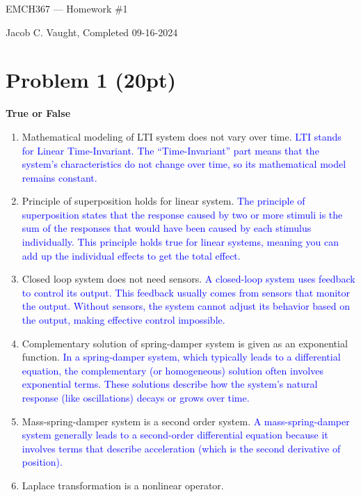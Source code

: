 \documentclass{article}
\begin{document}
\begin{center}
	{\Huge EMCH367 --- Homework \#1}
\end{center}
Jacob C. Vaught, Completed 09-16-2024

\section*{Problem 1 (20pt)}
\textbf{True or False}
\begin{enumerate}
	\item Mathematical modeling of LTI system does not vary over time.\newline
	      \textcolor{blue}{LTI stands for Linear Time-Invariant. The ``Time-Invariant'' part means that the system's characteristics do not change over time, so its mathematical model remains constant.}
	\item Principle of superposition holds for linear system.\newline
	      \textcolor{blue}{The principle of superposition states that the response caused by two or more stimuli is the sum of the responses that would have been caused by each stimulus individually. This principle holds true for linear systems, meaning you can add up the individual effects to get the total effect.}
	\item Closed loop system does not need sensors.\newline
	      \textcolor{blue}{A closed-loop system uses feedback to control its output. This feedback usually comes from sensors that monitor the output. Without sensors, the system cannot adjust its behavior based on the output, making effective control impossible.}
	\item Complementary solution of spring-damper system is given as an exponential function.\newline
	      \textcolor{blue}{In a spring-damper system, which typically leads to a differential equation, the complementary (or homogeneous) solution often involves exponential terms. These solutions describe how the system's natural response (like oscillations) decays or grows over time.}
	\item Mass-spring-damper system is a second order system.\newline
	      \textcolor{blue}{A mass-spring-damper system generally leads to a second-order differential equation because it involves terms that describe acceleration (which is the second derivative of position).}
	\item Laplace transformation is a nonlinear operator.\newline

\end{enumerate}
\end{document}
